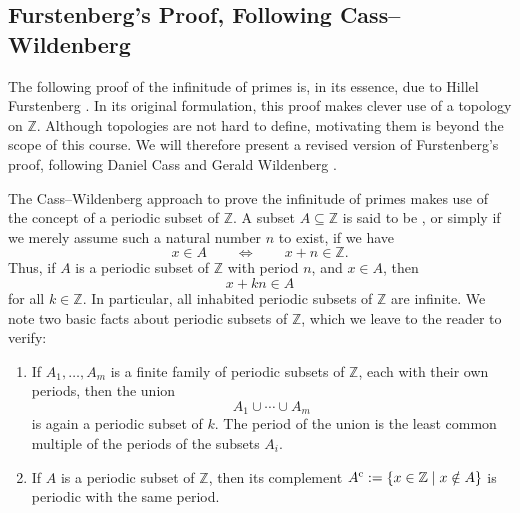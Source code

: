 \subsection{Furstenberg's Proof, Following Cass--Wildenberg}

The following proof of the infinitude of primes is, in its essence, due to Hillel Furstenberg \cite{furstenberg1955}. In its original formulation, this proof makes clever use of a topology on $\mathbb{Z}$. Although topologies are not hard to define, motivating them is beyond the scope of this course. We will therefore present a revised version of Furstenberg's proof, following Daniel Cass and Gerald Wildenberg \cite{cass2003}.

The Cass--Wildenberg approach to prove the infinitude of primes makes use of the concept of a periodic subset of $\mathbb{Z}$. A subset $A\subseteq\mathbb{Z}$ is said to be , or simply  if we merely assume such a natural number $n$ to exist, if we have
\begin{equation*}
  x\in A\qquad\Leftrightarrow\qquad x+n\in\mathbb{Z}.
\end{equation*}
Thus, if $A$ is a periodic subset of $\mathbb{Z}$ with period $n$, and $x\in A$, then
\begin{equation*}
  x+kn\in A
\end{equation*}
for all $k\in\mathbb{Z}$. In particular, all inhabited periodic subsets of $\mathbb{Z}$ are infinite. We note two basic facts about periodic subsets of $\mathbb{Z}$, which we leave to the reader to verify:
\begin{enumerate}
\item If $A_1,\ldots,A_m$ is a finite family of periodic subsets of $\mathbb{Z}$, each with their own periods, then the union
  \begin{equation*}
    A_1\cup\cdots\cup A_m
  \end{equation*}
  is again a periodic subset of $k$. The period of the union is the least common multiple of the periods of the subsets $A_i$.
\item If $A$ is a periodic subset of $\mathbb{Z}$, then its complement $A^{\mathrm{c}} :=\{x\in\mathbb{Z}\mid x\notin A\}$ is periodic with the same period.
\end{enumerate}

